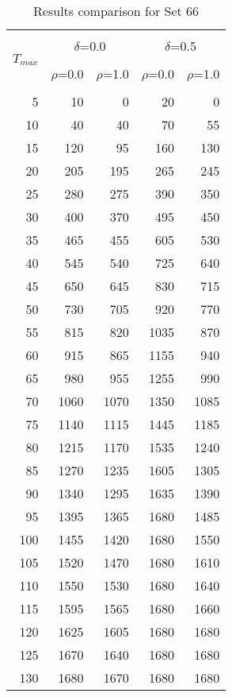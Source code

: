 \begin{table}[!htb]
\centering
{\renewcommand{\tabcolsep}{12pt}
\caption{Results comparison for Set 66\label{table:set66}}
\vspace{-0.75em}
\begin{tabular}{rrrrr}
\hline \\ [-1.8ex]
 \multirow{3}{*}{$T_{max}$}& \multicolumn{2}{c}{$\delta$=0.0}& \multicolumn{2}{c}{$\delta$=0.5} {\smallskip} \\  \cmidrule(lr){2-3} \cmidrule(lr){4-5} \\ [-1.8ex] 
 & $\rho$=0.0& $\rho$=1.0& $\rho$=0.0& $\rho$=1.0 \\ [-1.8ex] \\ \hline
5 & 10 & 0 & 20 & 0 \\
10 & 40 & 40 & 70 & 55 \\
15 & 120 & 95 & 160 & 130 \\
20 & 205 & 195 & 265 & 245 \\
25 & 280 & 275 & 390 & 350 \\
30 & 400 & 370 & 495 & 450 \\
35 & 465 & 455 & 605 & 530 \\
40 & 545 & 540 & 725 & 640 \\
45 & 650 & 645 & 830 & 715 \\
50 & 730 & 705 & 920 & 770 \\
55 & 815 & 820 & 1035 & 870 \\
60 & 915 & 865 & 1155 & 940 \\
65 & 980 & 955 & 1255 & 990 \\
70 & 1060 & 1070 & 1350 & 1085 \\
75 & 1140 & 1115 & 1445 & 1185 \\
80 & 1215 & 1170 & 1535 & 1240 \\
85 & 1270 & 1235 & 1605 & 1305 \\
90 & 1340 & 1295 & 1635 & 1390 \\
95 & 1395 & 1365 & 1680 & 1485 \\
100 & 1455 & 1420 & 1680 & 1550 \\
105 & 1520 & 1470 & 1680 & 1610 \\
110 & 1550 & 1530 & 1680 & 1640 \\
115 & 1595 & 1565 & 1680 & 1660 \\
120 & 1625 & 1605 & 1680 & 1680 \\
125 & 1670 & 1640 & 1680 & 1680 \\
130 & 1680 & 1670 & 1680 & 1680 \\
 \hline
\end{tabular}
}
\end{table}
